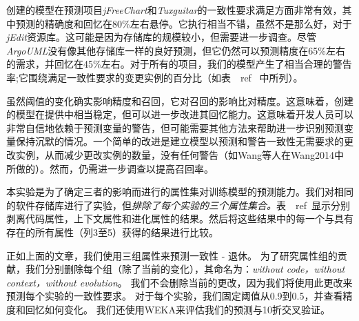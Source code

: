 {创建的模型在预测项目{\em jFreeChart}和{\em Tuxguitar}的一致性要求满足方面非常有效，其中预测的精确度和回忆在80\%左右悬停。它执行相当不错，虽然不是那么好，对于{\em jEdit}资源库。这可能是因为存储库的规模较小，但需要进一步调查。尽管{\em  ArgoUML}没有像其他存储库一样的良好预测，但它仍然可以预测精度在65\%左右的需求，并回忆在45\%左右。对于所有的项目，我们的模型产生了相当合理的警告率;它围绕满足一致性要求的变更实例的百分比（如表~\ ref {}~中所列）。

虽然阈值的变化确实影响精度和召回，它对召回的影响比对精度。这意味着，创建的模型在提供中相当稳定，但可以进一步改进其回忆能力。这意味着开发人员可以非常自信地依赖于预测变量的警告，但可能需要其他方法来帮助进一步识别预测变量保持沉默的情况。一个简单的改进是建立模型以预测和警告一致性无需要求的更改实例，从而减少更改实例的数量，没有任何警告（如Wang等人在\cite{}{Wang2014}中所做的）。然而，仍需进一步调查以提高召回率。


本实验是为了确定三者的影响而进行的属性集对训练模型的预测能力。我们对相同的软件存储库进行了实验，但{\em 排除了每个实验的三个属性集合。}表~\ ref{}~显示分别剥离代码属性，上下文属性和进化属性的结果。然后将这些结果中的每一个与具有存在的所有属性（列3至5）获得的结果进行比较。

正如上面的文章，我们使用{三组属性}来预测一致性 - 退休。 为了研究属性组的贡献，我们分别删除每个组（除了当前的变化），其命名为：{\em without code，without context，without evolution}。 我们不会删除当前的更改，因为我们将使用此更改来预测每个实验的一致性要求。 对于每个实验，我们固定阈值从0.9到0.5，并查看精度和回忆如何变化。 我们还使用WEKA来评估我们的预测与10折交叉验证。

}
